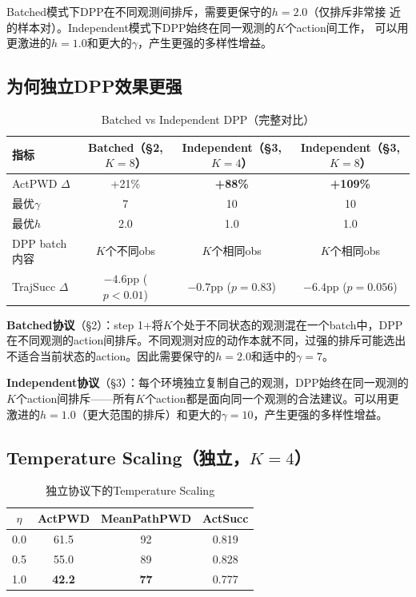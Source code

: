 \documentclass[11pt]{article}
\begin{document}
Batched模式下DPP在不同观测间排斥，需要更保守的$h=2.0$（仅排斥非常接
近的样本对）。Independent模式下DPP始终在同一观测的$K$个action间工作，
可以用更激进的$h=1.0$和更大的$\gamma$，产生更强的多样性增益。

\subsection{为何独立DPP效果更强}

\begin{table}[h]
\centering
\caption{Batched vs Independent DPP（完整对比）}
\begin{tabular}{lccc}
\toprule
指标 & Batched（\S2, $K{=}8$） & Independent（\S3, $K{=}4$） & Independent（\S3, $K{=}8$） \\
\midrule
ActPWD $\Delta$ & +21\% & \textbf{+88\%} & \textbf{+109\%} \\
最优$\gamma$ & 7 & 10 & 10 \\
最优$h$ & 2.0 & 1.0 & 1.0 \\
DPP batch内容 & $K$个不同obs & $K$个相同obs & $K$个相同obs \\
TrajSucc $\Delta$ & $-4.6$pp ($p{<}0.01$) & $-0.7$pp ($p{=}0.83$) & $-6.4$pp ($p{=}0.056$) \\
\bottomrule
\end{tabular}
\end{table}

\textbf{Batched协议}（\S2）：step 1+将$K$个处于不同状态的观测混在一个batch中，DPP在不同观测的action间排斥。不同观测对应的动作本就不同，过强的排斥可能选出不适合当前状态的action。因此需要保守的$h=2.0$和适中的$\gamma=7$。

\textbf{Independent协议}（\S3）：每个环境独立复制自己的观测，DPP始终在同一观测的$K$个action间排斥——所有$K$个action都是面向同一个观测的合法建议。可以用更激进的$h=1.0$（更大范围的排斥）和更大的$\gamma=10$，产生更强的多样性增益。

\subsection{Temperature Scaling（独立，$K=4$）}

\begin{table}[h]
\centering
\caption{独立协议下的Temperature Scaling}
\begin{tabular}{cccc}
\toprule
$\eta$ & ActPWD & MeanPathPWD & ActSucc \\
\midrule
0.0 & 61.5 & 92 & 0.819 \\
0.5 & 55.0 & 89 & 0.828 \\
1.0 & \textbf{42.2} & \textbf{77} & 0.777 \\
\bottomrule
\end{tabular}
\end{table}
\end{document}
